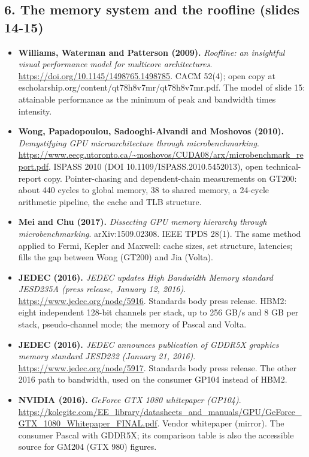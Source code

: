 \documentclass[11pt,letterpaper]{article}
\begin{document}
\subsection*{6. The memory system and the roofline (slides 14-15)}
\begin{itemize}[leftmargin=1.2em,itemsep=3pt]\sloppy
\item \textbf{Williams, Waterman and Patterson (2009).} \textit{Roofline: an insightful visual performance model for multicore architectures}. \url{https://doi.org/10.1145/1498765.1498785}. CACM 52(4); open copy at escholarship.org/content/qt78h8v7mr/qt78h8v7mr.pdf. The model of slide 15: attainable performance as the minimum of peak and bandwidth times intensity.
\item \textbf{Wong, Papadopoulou, Sadooghi-Alvandi and Moshovos (2010).} \textit{Demystifying GPU microarchitecture through microbenchmarking}. \url{https://www.eecg.utoronto.ca/~moshovos/CUDA08/arx/microbenchmark_report.pdf}. ISPASS 2010 (DOI 10.1109/ISPASS.2010.5452013), open technical-report copy. Pointer-chasing and dependent-chain measurements on GT200: about 440 cycles to global memory, 38 to shared memory, a 24-cycle arithmetic pipeline, the cache and TLB structure.
\item \textbf{Mei and Chu (2017).} \textit{Dissecting GPU memory hierarchy through microbenchmarking}. arXiv:1509.02308. IEEE TPDS 28(1). The same method applied to Fermi, Kepler and Maxwell: cache sizes, set structure, latencies; fills the gap between Wong (GT200) and Jia (Volta).
\item \textbf{JEDEC (2016).} \textit{JEDEC updates High Bandwidth Memory standard JESD235A (press release, January 12, 2016)}. \url{https://www.jedec.org/node/5916}. Standards body press release. HBM2: eight independent 128-bit channels per stack, up to 256 GB/s and 8 GB per stack, pseudo-channel mode; the memory of Pascal and Volta.
\item \textbf{JEDEC (2016).} \textit{JEDEC announces publication of GDDR5X graphics memory standard JESD232 (January 21, 2016)}. \url{https://www.jedec.org/node/5917}. Standards body press release. The other 2016 path to bandwidth, used on the consumer GP104 instead of HBM2.
\item \textbf{NVIDIA (2016).} \textit{GeForce GTX 1080 whitepaper (GP104)}. \url{https://kolegite.com/EE_library/datasheets_and_manuals/GPU/GeForce_GTX_1080_Whitepaper_FINAL.pdf}. Vendor whitepaper (mirror). The consumer Pascal with GDDR5X; its comparison table is also the accessible source for GM204 (GTX 980) figures.
\end{itemize}
\end{document}
